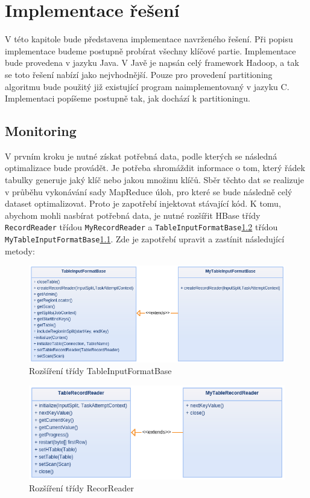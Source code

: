 \documentclass[thesis=M,czech]{FITthesis}[2012/06/26]
\begin{document}
\chapter{Implementace řešení}
V této kapitole bude představena implementace navrženého řešení. Při popisu implementace budeme postupně probírat všechny klíčové partie. Implementace bude provedena v jazyku Java. V Javě je napsán celý framework Hadoop, a tak se toto řešení nabízí jako nejvhodnější. Pouze pro provedení partitioning algoritmu bude použitý již existující program naimplementovaný v jazyku C. Implementaci popíšeme postupně tak, jak dochází k partitioningu.

\section{Monitoring}
V prvním kroku je nutné získat potřebná data, podle kterých se následná optimalizace bude provádět. Je potřeba shromáždit informace o tom, který řádek tabulky generuje jaký klíč nebo jakou množinu klíčů. Sběr těchto dat se realizuje v průběhu vykonávání sady MapReduce úloh, pro které se bude následně celý dataset optimalizovat. Proto je zapotřebí injektovat stávající kód. K tomu, abychom mohli nasbírat potřebná data, je nutné rozšířit HBase třídy \texttt{RecordReader} třídou \texttt{MyRecordReader} a \texttt{TableInputFormatBase}\ref{fig:record} třídou \texttt{MyTableInputFormatBase}\ref{fig:input}. Zde je zapotřebí upravit a zastínit následující metody:

\begin{figure}\centering
	\includegraphics[width=1\textwidth, angle=0]{files/input}
	\caption[Rozšíření třídy TableInputFormatBase]
	{Rozšíření třídy TableInputFormatBase}\label{fig:input}
\end{figure} 

\begin{figure}\centering
	\includegraphics[width=1\textwidth, angle=0]{files/record}
	\caption[Rozšíření třídy RecorReader]
	{Rozšíření třídy RecorReader}\label{fig:record}
\end{figure} 
\end{document}

